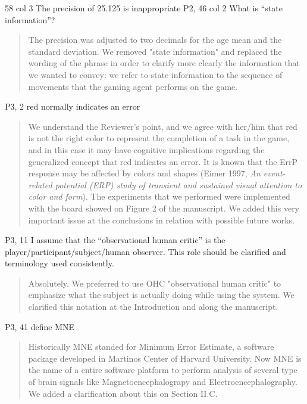 \documentclass[journal,onecolumn,12pt]{IEEEtran}
\begin{document}
58 col 3 The precision of 25.125 is inappropriate P2, 46 col 2 What is “state information”?

\vspace{2em}
\begin{quotation}
{\color{blue}
The precision was adjusted to two decimals for the age mean and the standard deviation.  We removed  "state information" and replaced the wording of the phrase in order to clarify more clearly the information that we wanted to convey:  we refer to state information to the sequence of movements that the gaming agent performs on the game.
}
\end{quotation}
\vspace{2em}

P3, 2 red normally indicates an error

\vspace{2em}
\begin{quotation}
{\color{blue}
We understand the Reviewer's point, and we agree with her/him that red is not the right color to represent the completion of a task in the game, and in this case it may have cognitive implications regarding the generalized concept that red indicates an error.   It is known that the ErrP response may be affected by colors and shapes (Eimer 1997, \textit{An event-related potential (ERP) study of transient and sustained visual attention to color and form}).  The experiments that we performed were implemented with the board showed on Figure 2 of the manuscript.  We added this very important issue at the conclusions in relation with possible future works.
}
\end{quotation}
\vspace{2em}

P3, 11 I assume that the “observational human critic” is the player/participant/subject/human observer. This role should be clarified and terminology used consistently.

\vspace{2em}
\begin{quotation}
{\color{blue}
Absolutely.  We preferred to use OHC "observational human critic" to emphasize what the subject is actually doing while using the system.  We clarified this notation at the Introduction and along the manuscript.
}
\end{quotation}
\vspace{2em}

P3, 41 define MNE

\vspace{2em}
\begin{quotation}
{\color{blue}
Historically MNE standed for Minimum Error Estimate, a software package developed in Martinos Center of Harvard University.  Now MNE  is the name of a entire software platform to perform analysis of several type of brain signals like Magnetoencephalograpy and Electroencephalography.  We added a clarification about this on Section II.C.
}
\end{quotation}
\vspace{2em}
\end{document}
